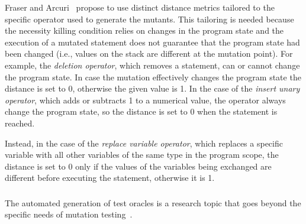 Fraser and Arcuri~\cite{fraser2015achieving} propose to use distinct distance metrics tailored to the specific operator used to generate the mutants.
This tailoring is needed because the necessity killing condition relies on changes in the program state and the execution of a mutated statement does not guarantee that the program state had been changed (i.e., values on the stack are different at the mutation point).
For example, the \textit{deletion operator}, which removes a statement, can or cannot change the program state. In case the mutation effectively changes the program state the distance is set to 0, otherwise the given value is 1.
In the case of the \textit{insert unary operator}, which adds or subtracts 1 to a numerical value, the operator always change the program state, so the distance is set to 0 when the statement is reached. 

Instead, in the case of the \textit{replace variable operator}, which replaces a specific variable with all other variables of the same type in the program scope, the distance is set to 0 only if the values of the variables being exchanged are different before executing the statement, otherwise it is 1.

\subsubsection{}
\label{sec:oraclesGeneration:codeDriven}

The automated generation of test oracles is a research topic that goes beyond the specific needs of mutation testing~\cite{Barr:Oracles:15,OLIVEIRA:Oracles:2014}.

